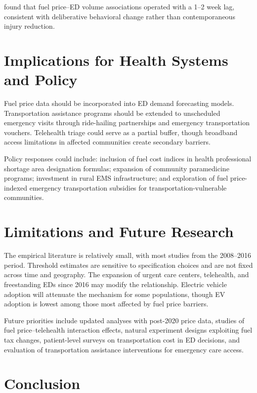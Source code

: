 \documentclass[12pt, a4paper]{article}
\begin{document}
\citet{caldwell2013} found that fuel price--ED volume associations operated with a 1--2 week lag, consistent with deliberative behavioral change rather than contemporaneous injury reduction.

\section{Implications for Health Systems and Policy}

Fuel price data should be incorporated into ED demand forecasting models. Transportation assistance programs should be extended to unscheduled emergency visits through ride-hailing partnerships and emergency transportation vouchers. Telehealth triage could serve as a partial buffer, though broadband access limitations in affected communities create secondary barriers.

Policy responses could include: inclusion of fuel cost indices in health professional shortage area designation formulas; expansion of community paramedicine programs; investment in rural EMS infrastructure; and exploration of fuel price-indexed emergency transportation subsidies for transportation-vulnerable communities.

\section{Limitations and Future Research}

The empirical literature is relatively small, with most studies from the 2008--2016 period. Threshold estimates are sensitive to specification choices and are not fixed across time and geography. The expansion of urgent care centers, telehealth, and freestanding EDs since 2016 may modify the relationship. Electric vehicle adoption will attenuate the mechanism for some populations, though EV adoption is lowest among those most affected by fuel price barriers.

Future priorities include updated analyses with post-2020 price data, studies of fuel price--telehealth interaction effects, natural experiment designs exploiting fuel tax changes, patient-level surveys on transportation cost in ED decisions, and evaluation of transportation assistance interventions for emergency care access.

\section{Conclusion}
\end{document}
